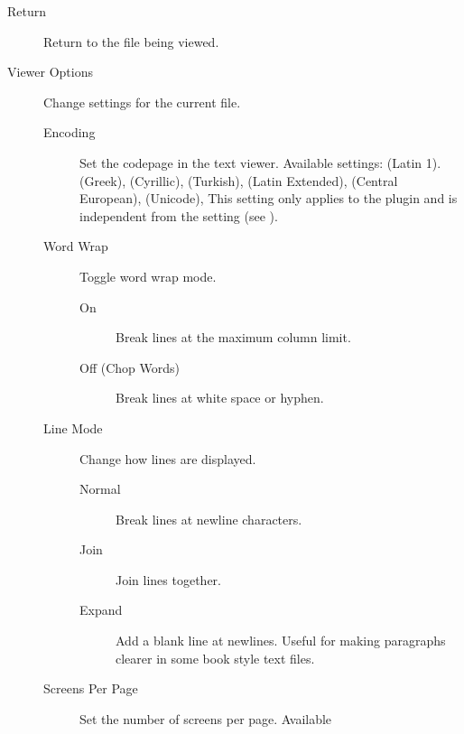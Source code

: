 \begin{description}
\item[Return] Return to the file being viewed.
\item[Viewer Options] Change settings for the current file.
    \begin{description}
    \item[Encoding] Set the codepage in the text viewer.
    Available settings:
     (Latin 1).
     (Greek),
     (Cyrillic),
     (Turkish),
     (Latin Extended),
     (Central European),
     (Unicode),
    This setting only applies to the plugin and is independent from the
     setting (see ).
    \item[Word Wrap] Toggle word wrap mode.
        \begin{description}
            \item[On] Break lines at the maximum column limit.
            \item[Off (Chop Words)] Break lines at white space or hyphen.
        \end{description}
    \item[Line Mode] Change how lines are displayed.
        \begin{description}
            \item[Normal] Break lines at newline characters.
            \item[Join] Join lines together.
            \item[Expand] Add a blank line at newlines. Useful for making paragraphs
            clearer in some book style text files.
        \end{description}
    \item[Screens Per Page] Set the number of screens per page. Available

\end{description}
\end{description}
